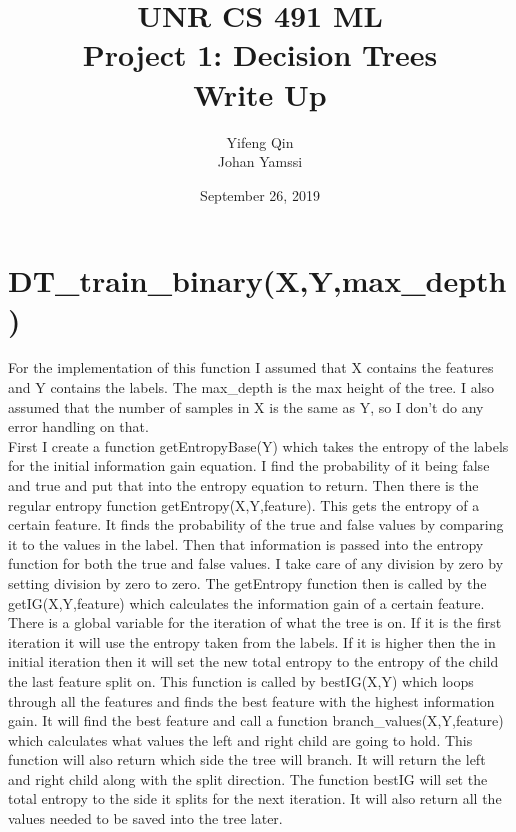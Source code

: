 \documentclass{article}
\title{UNR CS 491 ML \\ Project 1: Decision Trees \\ Write Up}
\author{Yifeng Qin \\ Johan Yamssi  }
\date{September 26, 2019}
\begin{document}
\maketitle

\section{DT\_train\_binary(X,Y,max\_depth)}
For the implementation of this function I assumed that X contains the features and Y contains the labels. The max\_depth is the max height of the tree. I also assumed that the number of samples in X is the same as Y, so I don't do any error handling on that. \\ First I create a function getEntropyBase(Y) which takes the entropy of the labels for the initial information gain equation. I find the probability of it being false and true and put that into the entropy equation to return. Then there is the regular entropy function getEntropy(X,Y,feature). This gets the entropy of a certain feature. It finds the probability of the true and false values by comparing it to the values in the label. Then that information is passed into the entropy function for both the true and false values. I take care of any division by zero by setting division by zero to zero. The getEntropy function then is called by the getIG(X,Y,feature) which calculates the information gain of a certain feature. There is a global variable for the iteration of what the tree is on. If it is the first iteration it will use the entropy taken from the labels. If it is higher then the in initial iteration then it will set the new total entropy to the entropy of the child the last feature split on. This function is called by bestIG(X,Y) which loops through all the features and finds the best feature with the highest information gain. It will find the best feature and call a function branch\_values(X,Y,feature) which calculates what values the left and right child are going to hold. This function will also return which side the tree will branch. It will return the left and right child along with the split direction. The function bestIG will set the total entropy to the side it splits for the next iteration. It will also return all the values needed to be saved into the tree later. \\
\end{document}
